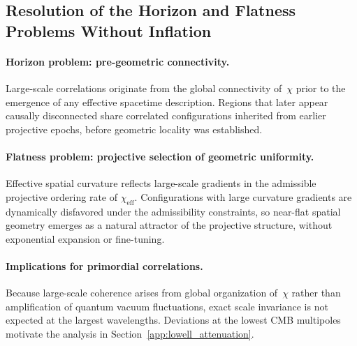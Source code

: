\subsection{Resolution of the Horizon and Flatness Problems Without Inflation}
  \label{subsec:cosmochrony_horizon_flatness}

  \paragraph{Horizon problem: pre-geometric connectivity.}
    Large-scale correlations originate from the global connectivity of~$\chi$
    prior to the emergence of any effective spacetime description.
    Regions that later appear causally disconnected share correlated
    configurations inherited from earlier projective epochs, before geometric
    locality was established.

  \paragraph{Flatness problem: projective selection of geometric uniformity.}
    Effective spatial curvature reflects large-scale gradients in the
    admissible projective ordering rate of $\chi_{\mathrm{eff}}$.
    Configurations with large curvature gradients are dynamically
    disfavored under the admissibility constraints, so near-flat spatial
    geometry emerges as a natural attractor of the projective structure,
    without exponential expansion or fine-tuning.

  \paragraph{Implications for primordial correlations.}
    Because large-scale coherence arises from global organization of~$\chi$
    rather than amplification of quantum vacuum fluctuations, exact
    scale invariance is not expected at the largest wavelengths.
    Deviations at the lowest CMB multipoles motivate the analysis in
    Section~\ref{app:lowell_attenuation}.
